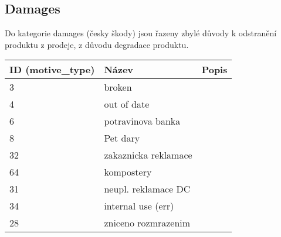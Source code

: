 \subsection*{Damages}

Do kategorie damages (česky škody) jsou řazeny zbylé důvody k odstranění produktu z prodeje, z důvodu degradace produktu. 

\begin{table}[]
    \begin{tabular}{lll}
    ID (motive\_type) & Název                  & Popis \\
    \hline
    3            & broken                 &       \\
    4            & out of date            &       \\
    6            & potravinova banka      &       \\
    8            & Pet dary               &       \\
    32           & zakaznicka reklamace   &       \\
    64           & kompostery             &       \\
    31           & neupl. reklamace DC    &       \\
    34           & internal use (err)     &       \\
    28           & zniceno rozmrazenim    &       \\
    \end{tabular}
\end{table}



